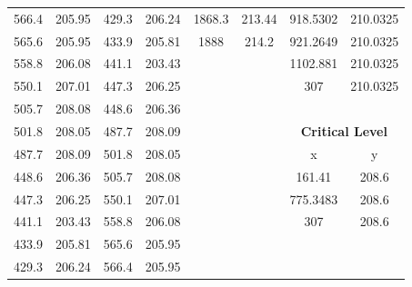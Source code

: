 \begin{center}
\begin{tabular}{|cccc||cc||cc|}
    566.4    & 205.95                   & 429.3 & 206.24                        & 1868.3 & 213.44                                & 918.5302 & 210.0325                            \\
    565.6    & 205.95                   & 433.9 & 205.81                        & 1888   & 214.2                                 & 921.2649 & 210.0325                            \\
    558.8    & 206.08                   & 441.1 & 203.43                        &        &                                       & 1102.881 & 210.0325                            \\
    550.1    & 207.01                   & 447.3 & 206.25                        &        &                                       & 307      & 210.0325                            \\
    505.7    & 208.08                   & 448.6 & 206.36                        &        &                                       &          &                                     \\
    501.8    & 208.05                   & 487.7 & 208.09                        &        &                                       & \multicolumn{2}{c|}{\textbf{Critical Level }}  \\ 
    \cline{7-8}
    487.7    & 208.09                   & 501.8 & 208.05                        &        &                                       & x        & y                                   \\
    448.6    & 206.36                   & 505.7 & 208.08                        &        &                                       & 161.41   & 208.6                               \\
    447.3    & 206.25                   & 550.1 & 207.01                        &        &                                       & 775.3483 & 208.6                               \\
    441.1    & 203.43                   & 558.8 & 206.08                        &        &                                       & 307      & 208.6                               \\
    433.9    & 205.81                   & 565.6 & 205.95                        &        &                                       &          &                                     \\
    429.3    & 206.24                   & 566.4 & 205.95                        &        &                                       &          &                                     \\

\end{tabular}
\end{center}
